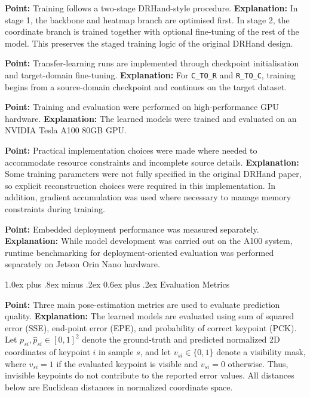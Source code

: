 \documentclass[10pt,letterpaper]{article}
\makeatletter
\renewcommand\subsection{\@startsection{subsection}{2}{\z@}%
  {1.0ex plus .8ex minus .2ex}%
  {0.6ex plus .2ex}%
  {\normalfont\itshape}}
\makeatother
\begin{document}
\medskip
\noindent\textbf{Point:} Training follows a two-stage DRHand-style procedure.  
\textbf{Explanation:} In stage 1, the backbone and heatmap branch are optimised first. In stage 2, the coordinate branch is trained together with optional fine-tuning of the rest of the model. This preserves the staged training logic of the original DRHand design.

\medskip
\noindent\textbf{Point:} Transfer-learning runs are implemented through checkpoint initialisation and target-domain fine-tuning.  
\textbf{Explanation:} For \texttt{C\_TO\_R} and \texttt{R\_TO\_C}, training begins from a source-domain checkpoint and continues on the target dataset.

\medskip
\noindent\textbf{Point:} Training and evaluation were performed on high-performance GPU hardware.  
\textbf{Explanation:} The learned models were trained and evaluated on an NVIDIA Tesla A100 80GB GPU.

\medskip
\noindent\textbf{Point:} Practical implementation choices were made where needed to accommodate resource constraints and incomplete source details.  
\textbf{Explanation:} Some training parameters were not fully specified in the original DRHand paper, so explicit reconstruction choices were required in this implementation. In addition, gradient accumulation was used where necessary to manage memory constraints during training.

\medskip
\noindent\textbf{Point:} Embedded deployment performance was measured separately.  
\textbf{Explanation:} While model development was carried out on the A100 system, runtime benchmarking for deployment-oriented evaluation was performed separately on Jetson Orin Nano hardware.

\subsection{Evaluation Metrics}

\noindent\textbf{Point:} Three main pose-estimation metrics are used to evaluate prediction quality.  
\textbf{Explanation:} The learned models are evaluated using sum of squared error (SSE), end-point error (EPE), and probability of correct keypoint (PCK). Let \(p_{si}, \hat{p}_{si} \in [0,1]^2\) denote the ground-truth and predicted normalized 2D coordinates of keypoint \(i\) in sample \(s\), and let \(v_{si} \in \{0,1\}\) denote a visibility mask, where \(v_{si}=1\) if the evaluated keypoint is visible and \(v_{si}=0\) otherwise. Thus, invisible keypoints do not contribute to the reported error values. All distances below are Euclidean distances in normalized coordinate space.
\end{document}
